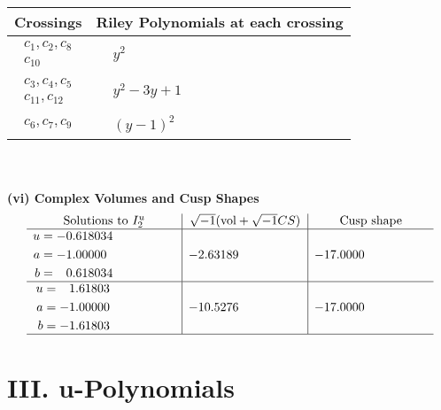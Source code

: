 \documentclass[1p]{elsarticle_modified}
\theoremstyle{definition}
\newcommand{\I}{\sqrt{-1}}
\begin{document}
\begin{tabular}{m{50pt}|m{274pt}}
Crossings & \hspace{64pt}Riley Polynomials at each crossing \\
\hline $$\begin{aligned}c_{1},c_{2},c_{8}\\c_{10}\end{aligned}$$&$\begin{aligned}
&y^2
\end{aligned}$\\
\hline $$\begin{aligned}c_{3},c_{4},c_{5}\\c_{11},c_{12}\end{aligned}$$&$\begin{aligned}
&y^2-3 y+1
\end{aligned}$\\
\hline $$\begin{aligned}c_{6},c_{7},c_{9}\end{aligned}$$&$\begin{aligned}
&(y-1)^2
\end{aligned}$\\
\hline
\end{tabular}\\~\\
\newpage\flushleft \textbf{(vi) Complex Volumes and Cusp Shapes}
$$\begin{array}{c|c|c}  
\text{Solutions to }I^u_{2}& \I (\text{vol} + \sqrt{-1}CS) & \text{Cusp shape}\\
 \hline 
\begin{aligned}
u &= -0.618034\phantom{ +0.000000I} \\
a &= -1.00000\phantom{ +0.000000I} \\
b &= \phantom{-}0.618034\phantom{ +0.000000I}\end{aligned}
 & -2.63189\phantom{ +0.000000I} & -17.0000\phantom{ +0.000000I} \\ \hline\begin{aligned}
u &= \phantom{-}1.61803\phantom{ +0.000000I} \\
a &= -1.00000\phantom{ +0.000000I} \\
b &= -1.61803\phantom{ +0.000000I}\end{aligned}
 & -10.5276\phantom{ +0.000000I} & -17.0000\phantom{ +0.000000I}\\
 \hline 
 \end{array}$$\newpage
\newpage\renewcommand{\arraystretch}{1}
\centering \section*{ III. u-Polynomials}
\end{document}
